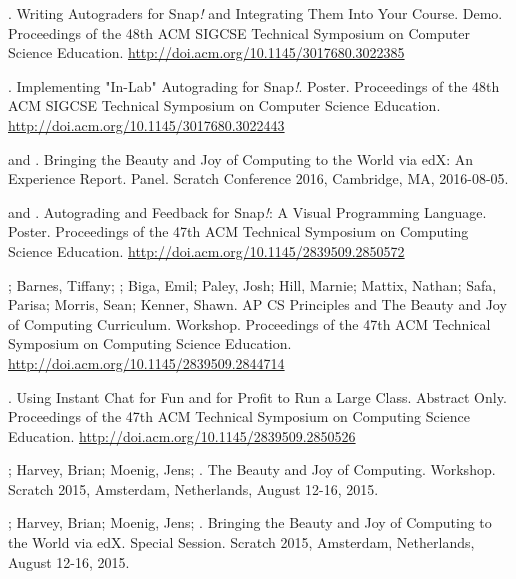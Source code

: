 \begin{etaremune}
    \item{\me. Writing Autograders for Snap\textit{!} and Integrating Them Into Your Course. Demo. Proceedings of the 48th ACM SIGCSE Technical Symposium on Computer Science Education.} \href{http://doi.acm.org/10.1145/3017680.3022385}{http://doi.acm.org/10.1145/3017680.3022385}

    \item{\me. Implementing "In-Lab" Autograding for Snap\textit{!}. Poster. Proceedings of the 48th ACM SIGCSE Technical Symposium on Computer Science Education.} \newline\href{http://doi.acm.org/10.1145/3017680.3022443}{http://doi.acm.org/10.1145/3017680.3022443}
    

    \item{\dan and \me. Bringing the Beauty and Joy of Computing to the World via edX: An Experience Report. Panel. Scratch Conference 2016, Cambridge, MA, 2016-08-05.}

    \item{\me and \dan. Autograding and Feedback for Snap\textit{!}: A Visual Programming Language. Poster. Proceedings of the 47th ACM Technical Symposium on Computing Science Education.}
    \href{http://doi.acm.org/10.1145/2839509.2850572}{http://doi.acm.org/10.1145/2839509.2850572}

    \item{\dan; Barnes, Tiffany; \me; Biga, Emil; Paley, Josh; Hill, Marnie; Mattix, Nathan; Safa, Parisa; Morris, Sean; Kenner, Shawn. AP CS Principles and The Beauty and Joy of Computing Curriculum. Workshop. Proceedings of the 47th ACM Technical Symposium on Computing Science Education.} \href{http://doi.acm.org/10.1145/2839509.2844714}{http://doi.acm.org/10.1145/2839509.2844714}

    \item{\me. Using Instant Chat for Fun and for Profit to Run a Large Class. Abstract Only. Proceedings of the 47th ACM Technical Symposium on Computing Science Education.} \href{http://doi.acm.org/10.1145/2839509.2850526}{http://doi.acm.org/10.1145/2839509.2850526}
    

    \item{\dan; Harvey, Brian; Moenig, Jens; \me. The Beauty and Joy of Computing. Workshop. Scratch 2015, Amsterdam, Netherlands, August 12-16, 2015.}

    \item{\dan; Harvey, Brian; Moenig, Jens; \me. Bringing the Beauty and Joy of Computing to the World via edX. Special Session. Scratch 2015, Amsterdam, Netherlands, August 12-16, 2015.}


\end{etaremune}
